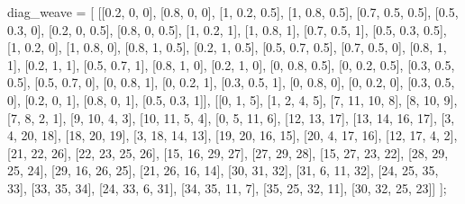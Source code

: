 diag_weave = [
    [[0.2, 0, 0], [0.8, 0, 0], [1, 0.2, 0.5], [1, 0.8, 0.5], [0.7, 0.5, 0.5],
     [0.5, 0.3, 0], [0.2, 0, 0.5], [0.8, 0, 0.5], [1, 0.2, 1], [1, 0.8, 1],
     [0.7, 0.5, 1], [0.5, 0.3, 0.5], [1, 0.2, 0], [1, 0.8, 0], [0.8, 1, 0.5],
     [0.2, 1, 0.5], [0.5, 0.7, 0.5], [0.7, 0.5, 0], [0.8, 1, 1], [0.2, 1, 1],
     [0.5, 0.7, 1], [0.8, 1, 0], [0.2, 1, 0], [0, 0.8, 0.5], [0, 0.2, 0.5],
     [0.3, 0.5, 0.5], [0.5, 0.7, 0], [0, 0.8, 1], [0, 0.2, 1], [0.3, 0.5, 1],
     [0, 0.8, 0], [0, 0.2, 0], [0.3, 0.5, 0], [0.2, 0, 1], [0.8, 0, 1], [0.5, 0.3, 1]],
    [[0, 1, 5], [1, 2, 4, 5], [7, 11, 10, 8], [8, 10, 9], [7, 8, 2, 1], [9, 10, 4, 3],
     [10, 11, 5, 4], [0, 5, 11, 6], [12, 13, 17], [13, 14, 16, 17], [3, 4, 20, 18],
     [18, 20, 19], [3, 18, 14, 13], [19, 20, 16, 15], [20, 4, 17, 16], [12, 17, 4, 2],
     [21, 22, 26], [22, 23, 25, 26], [15, 16, 29, 27], [27, 29, 28], [15, 27, 23, 22],
     [28, 29, 25, 24], [29, 16, 26, 25], [21, 26, 16, 14], [30, 31, 32], [31, 6, 11, 32],
     [24, 25, 35, 33], [33, 35, 34], [24, 33, 6, 31], [34, 35, 11, 7],
     [35, 25, 32, 11], [30, 32, 25, 23]]
];
